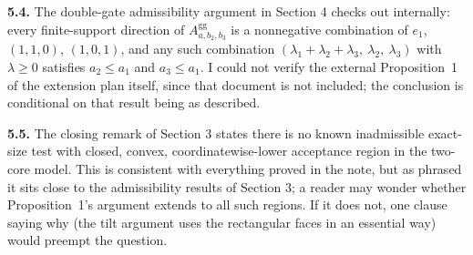 \documentclass[12pt]{article}
\begin{document}
\textbf{5.4.} The double-gate admissibility argument in Section 4 checks
out internally: every finite-support direction of
$A^{\mathrm{gg}}_{a,b_2,b_3}$ is a nonnegative combination of $e_1$,
$(1,1,0)$, $(1,0,1)$, and any such combination
$(\lambda_1+\lambda_2+\lambda_3,\ \lambda_2,\ \lambda_3)$ with
$\lambda\ge0$ satisfies $a_2\le a_1$ and $a_3\le a_1$. I could not
verify the external Proposition~1 of the extension plan itself, since
that document is not included; the conclusion is conditional on that
result being as described.

\textbf{5.5.} The closing remark of Section 3 states there is no known
inadmissible exact-size test with closed, convex, coordinatewise-lower
acceptance region in the two-core model. This is consistent with
everything proved in the note, but as phrased it sits close to the
admissibility results of Section 3; a reader may wonder whether
Proposition~1's argument extends to all such regions. If it does not,
one clause saying why (the tilt argument uses the rectangular faces in
an essential way) would preempt the question.
\end{document}
